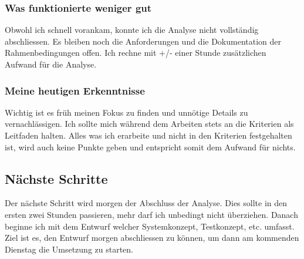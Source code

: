\subsubsection*{Was funktionierte weniger gut}
Obwohl ich schnell vorankam, konnte ich die Analyse nicht vollständig abschliessen. Es bleiben noch die Anforderungen und die 
Dokumentation der Rahmenbedingungen offen. Ich rechne mit +/- einer Stunde zusätzlichen Aufwand für die Analyse.

\subsubsection*{Meine heutigen Erkenntnisse}
Wichtig ist es früh meinen Fokus zu finden und unnötige Details zu vernachlässigen. Ich sollte mich während dem Arbeiten stets an die Kriterien
als Leitfaden halten. Alles was ich erarbeite und nicht in den Kriterien festgehalten ist, wird auch keine Punkte geben und entspricht somit
dem Aufwand für nichts.

\subsection*{Nächste Schritte}
Der nächste Schritt wird morgen der Abschluss der Analyse. Dies sollte in den ersten zwei Stunden passieren, mehr darf ich unbedingt nicht
überziehen. Danach beginne ich mit dem Entwurf welcher Systemkonzept, Testkonzept, etc. umfasst. Ziel ist es, den Entwurf morgen abschliessen zu können,
um dann am kommenden Dienstag die Umsetzung zu starten.

\pagebreak
